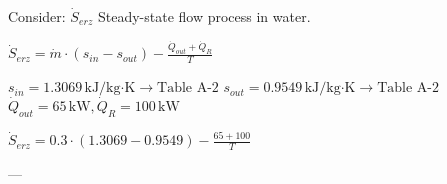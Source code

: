 Consider: \( \dot{S}_{erz} \)  
Steady-state flow process in water.  

\( \dot{S}_{erz} = \dot{m} \cdot (s_{in} - s_{out}) - \frac{\dot{Q}_{out} + \dot{Q}_R}{T} \)  

\( s_{in} = 1.3069 \, \text{kJ/kg·K} \rightarrow \text{Table A-2} \)  
\( s_{out} = 0.9549 \, \text{kJ/kg·K} \rightarrow \text{Table A-2} \)  
\( \dot{Q}_{out} = 65 \, \text{kW}, \dot{Q}_R = 100 \, \text{kW} \)  

\( \dot{S}_{erz} = 0.3 \cdot (1.3069 - 0.9549) - \frac{65 + 100}{T} \)  

---